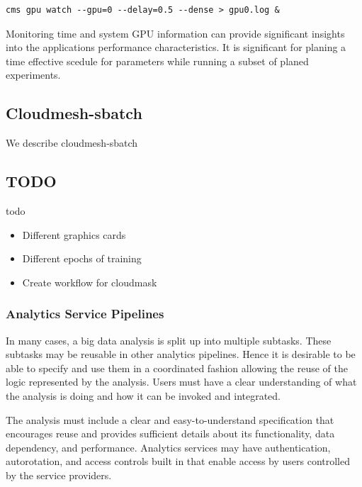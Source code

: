 \documentclass[utf8]{FrontiersinVancouver} %
\begin{document}
{\footnotesize
\begin{Verbatim}[commandchars=\\\{\}]
    cms gpu watch --gpu=0 --delay=0.5 --dense > gpu0.log &
\end{Verbatim}
}

Monitoring time and system GPU information can provide significant
insights into the applications performance characteristics. It is
significant for planing a time effective scedule for parameters while
running a subset of planed experiments.


\subsection{Cloudmesh-sbatch}
\label{sec:workflow-sbatch}

We describe cloudmesh-sbatch

\subsection{TODO}


todo 

\begin{itemize}
\item Different graphics cards

\item Different epochs of training

\item Create workflow for cloudmask
\end{itemize}


\subsubsection{Analytics Service Pipelines}

In many cases, a big data analysis is split up into multiple
subtasks. These subtasks may be reusable in other analytics
pipelines. Hence it is desirable to be able to specify and use them in
a coordinated fashion allowing the reuse of the logic represented by
the analysis. Users must have a clear understanding of what the
analysis is doing and how it can be invoked and integrated.

The analysis must include a clear and easy-to-understand specification
that encourages reuse and provides sufficient details about its
functionality, data dependency, and performance. Analytics services
may have authentication, autorotation, and access controls built in
that enable access by users controlled by the service providers.
\end{document}
